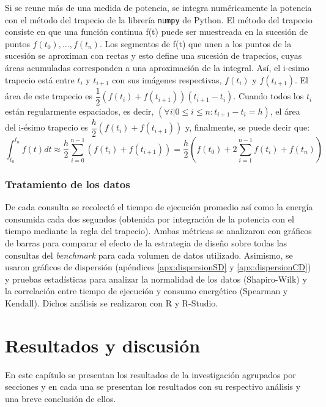 \documentclass[12pt, letter paper]{report}
\begin{document}
        Si se reune más de una medida de potencia, se integra numéricamente la
        potencia con el método del trapecio de la librería \texttt{numpy} de
        Python. El método del trapecio \cite{burden2010numerical} consiste en
        que una función continua f(t) puede ser muestreada en la sucesión de
        puntos $f(t_0), ..., f(t_n)$. Los segmentos de f(t) que unen a los
        puntos de la sucesión se aproximan con rectas y esto define una sucesión
        de trapecios, cuyas áreas acumuladas corresponden a una aproximación de
        la integral. Así, el i-esimo trapecio está entre $t_i$ y $t_{i + 1}$ con
        sus imágenes respectivas, $f(t_i)$ y $f(t_{i + 1})$. El área de este
        trapecio es $\dfrac{1}{2}(f(t_i) + f(t_{i + 1}))(t_{i + 1} - t_ {i})$.
        Cuando todos los $t_i$ están regularmente espaciados, es decir,
        $(\forall i | 0 \le i \le n : t_{i + 1} - t_i = h)$, el área del i-ésimo
        trapecio es $\dfrac{h}{2}(f(t_i) + f(t_{i + 1}))$ y, finalmente, se
        puede decir que: $$\int_{t_0}^{t_n} f(t) dt \approx \dfrac{h}{2}
        \sum_{i = 0}^{n - 1}(f(t_i) + f(t_{i + 1})) = \dfrac{h}{2} \left (
        f(t_0) + 2 \sum_{i = 1}^{n - 1} f(t_i) + f(t_n) \right )$$

      \subsection{Tratamiento de los datos} %
      \label{sub:tratamiento_de_los_datos}
        De cada consulta se recolectó el tiempo de ejecución promedio así como
        la energía consumida cada dos segundos (obtenida por integración de la
        potencia con el tiempo mediante la regla del trapecio). Ambas métricas
        se analizaron con gráficos de barras para comparar el efecto de la
        estrategia de diseño sobre todas las consultas del \textit{benchmark}
        para cada volumen de datos utilizado. Asimismo, se usaron gráficos de
        dispersión (apéndices \ref{apx:dispersionSD} y \ref{apx:dispersionCD}) y
        pruebas estadísticas para analizar la normalidad de los datos
        (Shapiro-Wilk) y la correlación entre tiempo de ejecución y consumo
        energético (Spearman y Kendall). Dichos análisis se realizaron con R y
        R-Studio.

  \chapter{Resultados y discusión} %
  \label{cha:resultados_y_discusión}
    En este capítulo se presentan los resultados de la investigación agrupados
    por secciones y en cada una se presentan los resultados con su respectivo
    análisis y una breve conclusión de ellos.
\end{document}
